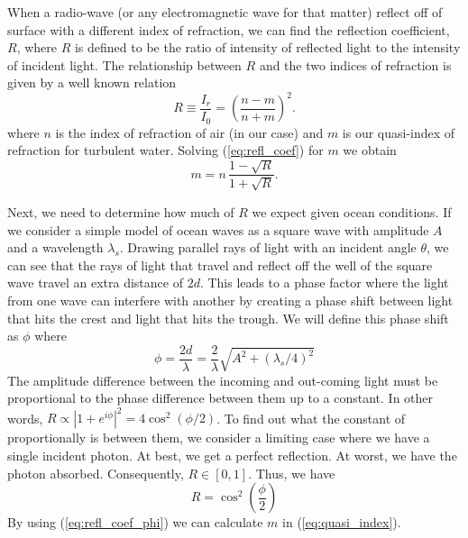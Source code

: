 \documentclass[11pt]{article}
\numberwithin{equation}{section}
\begin{document}
When a radio-wave (or any electromagnetic wave for that matter) reflect off of surface with a different index of refraction, we can find the reflection coefficient, $R$, where $R$ is defined to be the ratio of intensity of reflected light to the intensity of incident light. The relationship between $R$ and the two indices of refraction is given by a well known relation\cite{jackson1999classical,griffiths2005introduction}
\begin{equation}
    R \equiv \frac{I_r}{I_0} = \left(\frac{n-m}{n+m}\right)^2.
    \label{eq:refl_coef}
\end{equation}
where $n$ is the index of refraction of air (in our case) and $m$ is our quasi-index of refraction for turbulent water. Solving (\ref{eq:refl_coef}) for $m$ we obtain
\begin{equation}
    m = n \, \frac{1 - \sqrt R}{1+\sqrt{R}}.
    \label{eq:quasi_index}
\end{equation}

Next, we need to determine how much of $R$ we expect given ocean conditions. If we consider a simple model of ocean waves as a square wave with amplitude $A$ and a wavelength $\lambda_s$. Drawing parallel rays of light with an incident angle $\theta$, we can see that the rays of light that travel and reflect off the well of the square wave travel an extra distance of $2d$. This leads to a phase factor where the light from one wave can interfere with another by creating a phase shift between light that hits the crest and light that hits the trough. We will define this phase shift as $\phi$ where 
\begin{equation}
    \phi = \frac{2d}{\lambda} = \frac{2}{\lambda}\sqrt{A^2 + (\lambda_s/4)^2}
\end{equation}
The amplitude difference between the incoming and out-coming light must be proportional to the phase difference between them up to a constant. In other words, $R \propto |1+e^{i\phi}|^2 = 4 \cos^2(\phi/2)$. To find out what the constant of proportionally is between them, we consider a limiting case where we have a single incident photon. At best, we get a perfect reflection. At worst, we have the photon absorbed. Consequently, $R \in [0,1]$. Thus, we have
\begin{equation}
    R = \cos^2\left(\frac\phi2\right)
    \label{eq:refl_coef_phi}
\end{equation}
By using (\ref{eq:refl_coef_phi}) we can calculate $m$ in (\ref{eq:quasi_index}).

\end{document}

